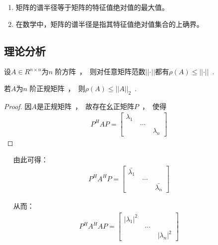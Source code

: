 \documentclass[cs4size,a4paper]{ctexart}
\numberwithin{equation}{section}
\numberwithin{table}{section}
\numberwithin{figure}{section}
\begin{document}
\begin{enumerate}
\item 矩阵的谱半径等于矩阵的特征值绝对值的最大值。
\item 在数学中，矩阵的谱半径是指其特征值绝对值集合的上确界。
\end{enumerate}


\subsection{理论分析}


\begin{theorem}
\label{rotM}
设$ A \in R^{n \times n} $为$ n $ 阶方阵~，~则对任意矩阵范数$ \left|\left|\cdot\right|\right| $都有$ \rho\left(A\right)\leq\left|\left|\cdot\right|\right| $~.~
\end{theorem}

\begin{theorem}
\label{rotM}
若$ A $为$ n $ 阶正规矩阵~，~则$ \rho\left(A\right)\leq\left|\left|A\right|\right|_2 $~.~
\end{theorem}


\begin{proof}
因$ A $是正规矩阵~，~故存在幺正矩阵$ P $~，~使得
\begin{align}
\label{P^HAP}
  P^HAP=\begin{bmatrix} \lambda_1&~ ~ &~ ~ \\
				   ~ ~&~...~&~ ~\\
				   ~ ~&~ ~&\lambda_n
\end{bmatrix} 
\end{align}
\end{proof}

~ ~由此可得：
\begin{align}
\label{P^HA^HP}
  P^HA^HP=\begin{bmatrix}\bar{\lambda_1}&~ ~ &~ ~ \\
				~ ~&~...~&~ ~\\
				~ ~&~ ~&\bar{\lambda_n}
\end{bmatrix}
\end{align}

~   ~从而：
\begin{align}
\label{P^HA^HAP}
  P^HA^HAP=\begin{bmatrix}\left|\lambda_1\right|^2&~ ~ &~ ~ \\
				~ ~&~...~&~ ~\\
				~ ~&~ ~&\left|\lambda_n\right|^2
\end{bmatrix}
\end{align}
\end{document}
